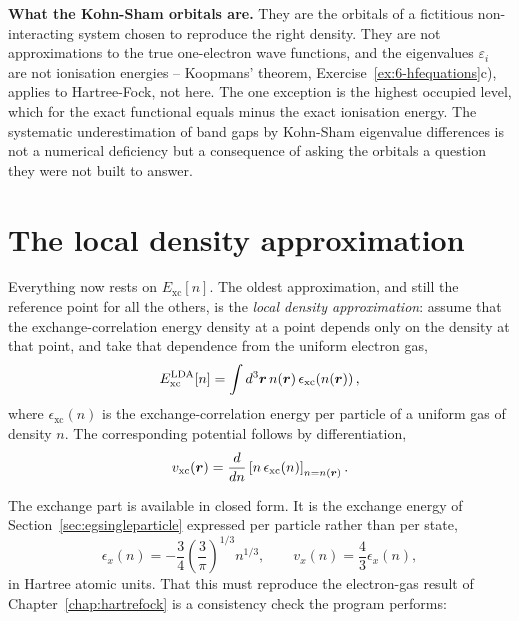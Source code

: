 \begin{notebox}
\textbf{What the Kohn-Sham orbitals are.}
\label{sec:ksmeaning}
They are the orbitals of a fictitious non-interacting system chosen to
reproduce the right density.  They are not approximations to the true
one-electron wave functions, and the eigenvalues $\varepsilon_i$ are not
ionisation energies -- Koopmans' theorem, Exercise~\ref{ex:6-hfequations}c),
applies to Hartree-Fock, not here.  The one exception is the highest occupied
level, which for the exact functional equals minus the exact ionisation
energy.  The systematic underestimation of band gaps by Kohn-Sham eigenvalue
differences is not a numerical deficiency but a consequence of asking the
orbitals a question they were not built to answer.
\end{notebox}

\section{The local density approximation}
\label{sec:lda}

Everything now rests on $E_{\mathrm{xc}}[n]$.  The oldest approximation, and
still the reference point for all the others, is the \emph{local density
approximation}: assume that the exchange-correlation energy density at a
point depends only on the density at that point, and take that dependence
from the uniform electron gas,
\begin{equation}
  E_{\mathrm{xc}}^{\mathrm{LDA}}[n]
   = \int d^3\bm{r}\,n(\bm{r})\,
     \epsilon_{\mathrm{xc}}\!\left(n(\bm{r})\right),
  \label{eq:8-lda}
\end{equation}
where $\epsilon_{\mathrm{xc}}(n)$ is the exchange-correlation energy per
particle of a uniform gas of density $n$.  The corresponding potential
follows by differentiation,
\begin{equation}
  v_{\mathrm{xc}}(\bm{r})
   = \frac{d}{dn}
     \left[n\,\epsilon_{\mathrm{xc}}(n)\right]_{n=n(\bm{r})} .
  \label{eq:8-vxclda}
\end{equation}

The exchange part is available in closed form.  It is the exchange energy of
Section~\ref{sec:egsingleparticle} expressed per particle rather than per
state,
\begin{equation}
  \epsilon_{x}(n) = -\frac{3}{4}\left(\frac{3}{\pi}\right)^{1/3}n^{1/3},
  \qquad
  v_{x}(n) = \frac{4}{3}\epsilon_x(n),
  \label{eq:8-ldaexchange}
\end{equation}
in Hartree atomic units.  That this must reproduce the electron-gas result of
Chapter~\ref{chap:hartrefock} is a consistency check the program performs:

